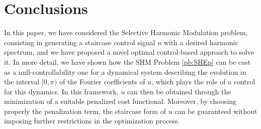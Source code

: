 \documentclass[twocolumn]{autart}    %
\begin{document}
%
%

\section{Conclusions}\label{sec:conclusions}

In this paper, we have considered the Selective Harmonic Modulation problem, consisting in generating a staircase control signal $u$ with a desired harmonic spectrum, and we have proposed a novel optimal control-based approach to solve it. In more detail, we have shown how the SHM Problem \eqref{pb:SHEp} can be cast as a null-controllability one for a dynamical system describing the evolution in the interval $[0,\pi)$ of the Fourier coefficients of $u$, which plays the role of a control for this dynamics. In this framework, $u$ can then be obtained through the minimization of a suitable penalized cost functional. Moreover, by choosing properly the penalization term, the staircase form of $u$ can be guaranteed without imposing further restrictions in the optimization process. 
\end{document}

